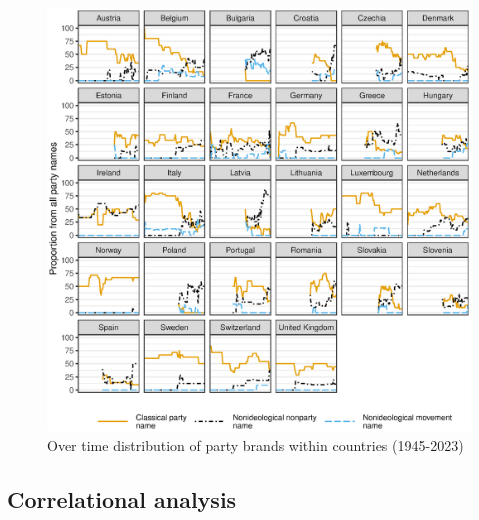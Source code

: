 \documentclass[12pt]{article}
\begin{document}
\clearpage



\newpage

\begin{figure}[H]
\includegraphics[width=\textwidth]{./Figures/country_timeline.eps}
\caption{Over time distribution of party brands within countries (1945-2023)}
\end{figure}

\newpage

\subsection{Correlational analysis}
\end{document}
